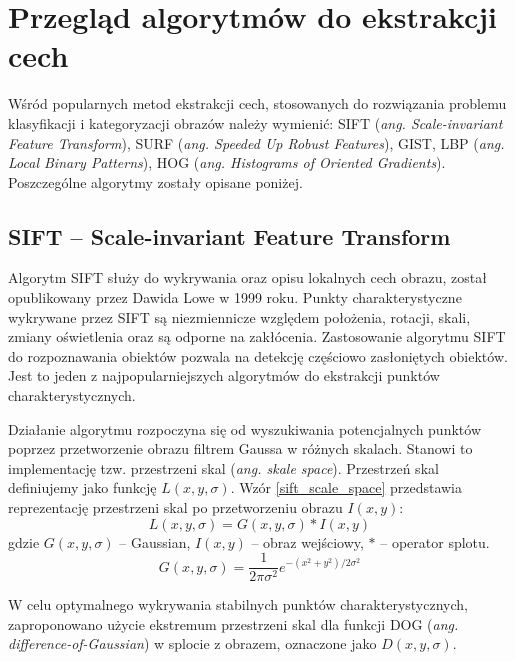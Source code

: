 \section{Przegląd algorytmów do ekstrakcji cech}

Wśród popularnych metod ekstrakcji cech, stosowanych do rozwiązania problemu klasyfikacji i kategoryzacji obrazów należy wymienić: SIFT (\emph{ang. Scale-invariant Feature Transform})\cite{SIFT99}, SURF (\emph{ang. Speeded Up Robust Features}), GIST\cite{GIST09}, LBP (\emph{ang. Local Binary Patterns}), HOG (\emph{ang. Histograms of Oriented Gradients}). Poszczególne algorytmy zostały opisane poniżej.

\subsection{SIFT -- Scale-invariant Feature Transform}

Algorytm SIFT służy do wykrywania oraz opisu lokalnych cech obrazu, został opublikowany przez Dawida Lowe w 1999 roku.\cite{SIFT99} Punkty charakterystyczne wykrywane przez SIFT są niezmiennicze względem położenia, rotacji, skali, zmiany oświetlenia oraz są odporne na zakłócenia. Zastosowanie algorytmu SIFT do rozpoznawania obiektów pozwala na detekcję częściowo zasłoniętych obiektów. Jest to jeden z najpopularniejszych algorytmów do ekstrakcji punktów charakterystycznych.

Działanie algorytmu rozpoczyna się od wyszukiwania potencjalnych punktów poprzez przetworzenie obrazu filtrem Gaussa w różnych skalach. Stanowi to implementację tzw. przestrzeni skal (\emph{ang. skale space}). Przestrzeń skal definiujemy jako funkcję $L(x, y, \sigma)$. Wzór \ref{sift_scale_space} przedstawia reprezentację przestrzeni skal po przetworzeniu obrazu $I(x, y)$:
\begin{equation} 
\label{sift_scale_space} 
L(x, y, \sigma) = G(x, y, \sigma) \ast I(x, y)
\end{equation} gdzie $G(x, y, \sigma)$ -- Gaussian, $I(x, y)$ -- obraz wejściowy, $\ast$ -- operator splotu.
\begin{equation} 
\label{sift_gaussian} 
G(x, y, \sigma) = \frac{1}{2\pi\sigma^2}e^{-(x^2+y^2)/2\sigma^2}
\end{equation} 

W celu optymalnego wykrywania stabilnych punktów charakterystycznych, zaproponowano użycie ekstremum przestrzeni skal dla funkcji DOG (\emph{ang. difference-of-Gaussian}) w splocie z obrazem, oznaczone jako $D(x, y, \sigma)$.

